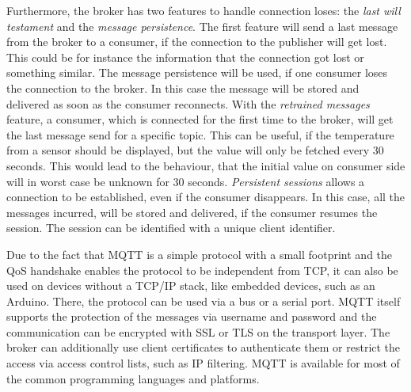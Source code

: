 Furthermore, the broker has two features to handle connection loses: the \textit{last will testament} and the \textit{message persistence}.
The first feature will send a last message from the broker to a consumer, if the connection to the publisher will get lost.
This could be for instance the information that the connection got lost or something similar.
The message persistence will be used, if one consumer loses the connection to the broker.
In this case the message will be stored and delivered as soon as the consumer reconnects.
With the \textit{retrained messages} feature, a consumer, which is connected for the first time to the broker, will get the last message send for a specific topic.
This can be useful, if the temperature from a sensor should be displayed, but the value will only be fetched every 30 seconds.
This would lead to the behaviour, that the initial value on consumer side will in worst case be unknown for 30 seconds.
\textit{Persistent sessions} allows a connection to be established, even if the consumer disappears.
In this case, all the messages incurred, will be stored and delivered, if the consumer resumes the session.
The session can be identified with a unique client identifier.\autocite[cf.]{Bayer:MQTT}

Due to the fact that \ac{MQTT} is a simple protocol with a small footprint and the \ac{QoS} handshake enables the protocol to be independent from \acs{TCP}, it can also be used on devices without a TCP/IP stack, like embedded devices, such as an Arduino.\autocite[cf.]{Bayer:MQTT}
There, the protocol can be used via a bus or a serial port.\autocite[cf.]{Bayer:MQTT}
\ac{MQTT} itself supports the protection of the messages via username and password and the communication can be encrypted with \acs{SSL} or \acs{TLS} on the transport layer.\autocite[cf.]{Bayer:MQTT}
The broker can additionally use client certificates to authenticate them or restrict the access via access control lists, such as \acs{IP} filtering.\autocite[cf.]{Bayer:MQTT}
\ac{MQTT} is available for most of the common programming languages and platforms.


